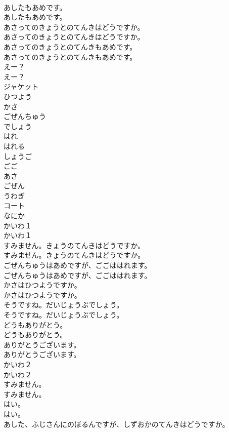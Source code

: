 \documentclass[8pt]{extreport}
\begin{document}
\begin{CJK}{UTF8}{min}
\\	あしたもあめです。	
\\	あしたもあめです。 
\\	あさってのきょうとのてんきはどうですか。	
\\	あさってのきょうとのてんきはどうですか。 
\\	あさってのきょうとのてんきもあめです。	
\\	あさってのきょうとのてんきもあめです。 
\\	えー？	
\\	えー？ 
\\	ジャケット
\\	ひつよう
\\	かさ
\\	ごぜんちゅう
\\	でしょう
\\	はれ
\\	はれる
\\	しょうご
\\	ごご
\\	あさ
\\	ごぜん
\\	うわぎ
\\	コート
\\	なにか
\\	かいわ１	
\\	かいわ１ 
\\	すみません。きょうのてんきはどうですか。	
\\	すみません。きょうのてんきはどうですか。 
\\	ごぜんちゅうはあめですが、ごごははれます。	
\\	ごぜんちゅうはあめですが、ごごははれます。 
\\	かさはひつようですか。	
\\	かさはひつようですか。 
\\	そうですね。だいじょうぶでしょう。	
\\	そうですね。だいじょうぶでしょう。 
\\	どうもありがとう。	
\\	どうもありがとう。 
\\	ありがとうございます。	
\\	ありがとうございます。 
\\	かいわ２	
\\	かいわ２ 
\\	すみません。	
\\	すみません。 
\\	はい。	
\\	はい。 
\\	あした、ふじさんにのぼるんですが、しずおかのてんきはどうですか。	

\end{CJK}
\end{document}
